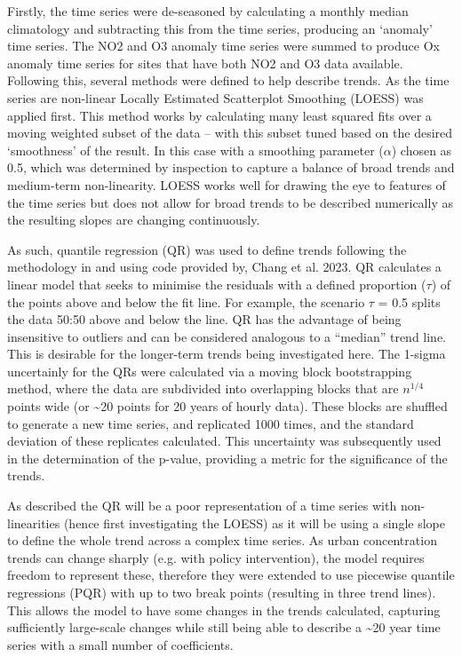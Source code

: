 \documentclass[journal abbreviation, manuscript]{copernicus}
\begin{document}
Firstly, the time series were de-seasoned by calculating a monthly median climatology and subtracting this from the time series, producing an ‘anomaly’ time series. The NO2 and O3 anomaly time series were summed to produce Ox anomaly time series for sites that have both NO2 and O3 data available. Following this, several methods were defined to help describe trends. As the time series are non-linear Locally Estimated Scatterplot Smoothing (LOESS) was applied first. This method works by calculating many least squared fits over a moving weighted subset of the data – with this subset tuned based on the desired ‘smoothness’ of the result. In this case with a smoothing parameter ($\alpha$) chosen as 0.5, which was determined by inspection to capture a balance of broad trends and medium-term non-linearity. LOESS works well for drawing the eye to features of the time series but does not allow for broad trends to be described numerically as the resulting slopes are changing continuously. 

As such, quantile regression (QR) was used to define trends following the methodology in and using code provided by, Chang et al. 2023. QR calculates a linear model that seeks to minimise the residuals with a defined proportion ($\tau$) of the points above and below the fit line. For example, the scenario $\tau$ = 0.5 splits the data 50:50 above and below the line. QR has the advantage of being insensitive to outliers and can be considered analogous to a “median” trend line. This is desirable for the longer-term trends being investigated here. The 1-sigma uncertainly for the QRs were calculated via a moving block bootstrapping method, where the data are subdivided into overlapping blocks that are $n^{1/4}$ points wide (or \textasciitilde{20} points for 20 years of hourly data). These blocks are shuffled to generate a new time series, and replicated 1000 times, and the standard deviation of these replicates calculated. This uncertainty was subsequently used in the determination of the p-value, providing a metric for the significance of the trends. 

As described the QR will be a poor representation of a time series with non-linearities (hence first investigating the LOESS) as it will be using a single slope to define the whole trend across a complex time series. As urban concentration trends can change sharply (e.g. with policy intervention), the model requires freedom to represent these, therefore they were extended to use piecewise quantile regressions (PQR) with up to two break points (resulting in three trend lines). This allows the model to have some changes in the trends calculated, capturing sufficiently large-scale changes while still being able to describe a \textasciitilde{20} year time series with a small number of coefficients.
\end{document}
